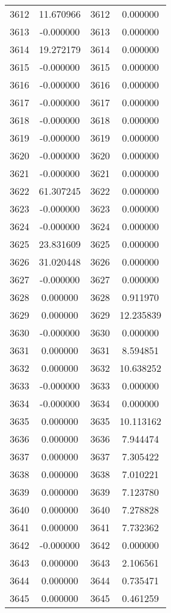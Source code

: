 \documentclass[12pt]{article}
\begin{document}
\begin{longtable}{@{}cccc@{}}
3612 & 11.670966 & 3612 & 0.000000 \\
3613 & -0.000000 & 3613 & 0.000000 \\
3614 & 19.272179 & 3614 & 0.000000 \\
3615 & -0.000000 & 3615 & 0.000000 \\
3616 & -0.000000 & 3616 & 0.000000 \\
3617 & -0.000000 & 3617 & 0.000000 \\
3618 & -0.000000 & 3618 & 0.000000 \\
3619 & -0.000000 & 3619 & 0.000000 \\
3620 & -0.000000 & 3620 & 0.000000 \\
3621 & -0.000000 & 3621 & 0.000000 \\
3622 & 61.307245 & 3622 & 0.000000 \\
3623 & -0.000000 & 3623 & 0.000000 \\
3624 & -0.000000 & 3624 & 0.000000 \\
3625 & 23.831609 & 3625 & 0.000000 \\
3626 & 31.020448 & 3626 & 0.000000 \\
3627 & -0.000000 & 3627 & 0.000000 \\
3628 & 0.000000 & 3628 & 0.911970 \\
3629 & 0.000000 & 3629 & 12.235839 \\
3630 & -0.000000 & 3630 & 0.000000 \\
3631 & 0.000000 & 3631 & 8.594851 \\
3632 & 0.000000 & 3632 & 10.638252 \\
3633 & -0.000000 & 3633 & 0.000000 \\
3634 & -0.000000 & 3634 & 0.000000 \\
3635 & 0.000000 & 3635 & 10.113162 \\
3636 & 0.000000 & 3636 & 7.944474 \\
3637 & 0.000000 & 3637 & 7.305422 \\
3638 & 0.000000 & 3638 & 7.010221 \\
3639 & 0.000000 & 3639 & 7.123780 \\
3640 & 0.000000 & 3640 & 7.278828 \\
3641 & 0.000000 & 3641 & 7.732362 \\
3642 & -0.000000 & 3642 & 0.000000 \\
3643 & 0.000000 & 3643 & 2.106561 \\
3644 & 0.000000 & 3644 & 0.735471 \\
3645 & 0.000000 & 3645 & 0.461259 \\

\end{longtable}
\end{document}
